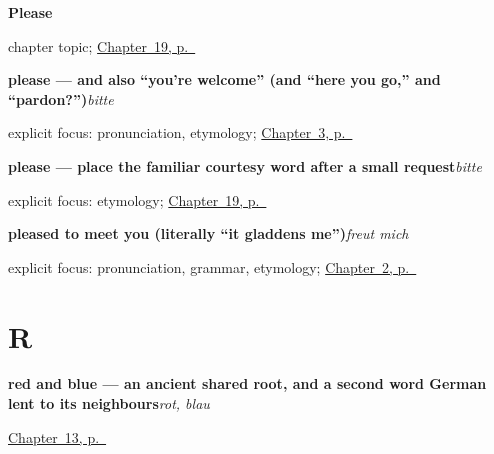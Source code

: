 \noindent\begin{minipage}[t]{\linewidth}
\raggedright
\textbf{Please}\par
\footnotesize chapter topic; \hyperref[ch:ge-please]{Chapter~19, p.~\pageref*{ch:ge-please}}
\end{minipage}\par\smallskip

\noindent\begin{minipage}[t]{\linewidth}
\raggedright
\textbf{please — and also \textquotedblleft{}you're welcome\textquotedblright{} (and \textquotedblleft{}here you go,\textquotedblright{} and \textquotedblleft{}pardon?\textquotedblright{})}\enspace\emph{bitte}\par
\footnotesize explicit focus: pronunciation, etymology; \hyperref[ch:how-are-you]{Chapter~3, p.~\pageref*{ch:how-are-you}}
\end{minipage}\par\smallskip

\noindent\begin{minipage}[t]{\linewidth}
\raggedright
\textbf{please — place the familiar courtesy word after a small request}\enspace\emph{bitte}\par
\footnotesize explicit focus: etymology; \hyperref[ch:ge-please]{Chapter~19, p.~\pageref*{ch:ge-please}}
\end{minipage}\par\smallskip

\noindent\begin{minipage}[t]{\linewidth}
\raggedright
\textbf{pleased to meet you (literally \textquotedblleft{}it gladdens me\textquotedblright{})}\enspace\emph{freut mich}\par
\footnotesize explicit focus: pronunciation, grammar, etymology; \hyperref[ch:introductions]{Chapter~2, p.~\pageref*{ch:introductions}}
\end{minipage}\par\smallskip

\section*{R}

\noindent\begin{minipage}[t]{\linewidth}
\raggedright
\textbf{red and blue — an ancient shared root, and a second word German lent to its neighbours}\enspace\emph{rot, blau}\par
\footnotesize \hyperref[ch:colours]{Chapter~13, p.~\pageref*{ch:colours}}
\end{minipage}\par\smallskip

